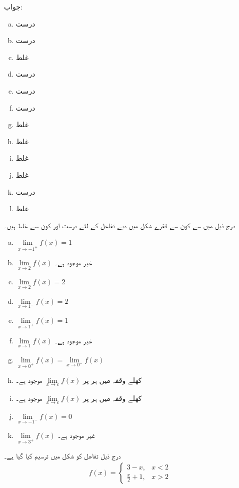 جواب:\quad
\begin{multicols}{6}
\begin{enumerate}[a.]
\item
درست
\item
درست
\item
غلط
\item
درست
\item
درست
\item
درست
\item
غلط
\item
غلط
\item
غلط
\item
غلط
\item
درست
\item
غلط
\end{enumerate}
\end{multicols}
درج ذیل میں سے کون سے فقرے شکل  میں دیے تفاعل کے لئے درست اور کون سے غلط ہیں۔
\begin{multicols}{2}
\begin{enumerate}[a.]
\item
$\lim\limits_{x\to -1^+}f(x)=1$
\item
$\lim\limits_{x\to 2}f(x)$
غیر موجود ہے۔
\item
$\lim\limits_{x\to 2}f(x)=2$
\item
$\lim\limits_{x\to 1^-}f(x)=2$
\item
$\lim\limits_{x\to 1^+}f(x)=1$
\item
$\lim\limits_{x\to 1}f(x)$
غیر موجود ہے۔
\item
$\lim\limits_{x\to 0^+}f(x)=\lim\limits_{x\to 0^-}f(x)$
\item
کھلے وقفہ  میں ہر  پر 
$\lim\limits_{x\to c}f(x)$
موجود ہے۔
\item
کھلے وقفہ  میں ہر  پر 
$\lim\limits_{x\to c}f(x)$
موجود ہے۔
\item
$\lim\limits_{x\to -1^-}f(x)=0$
\item
$\lim\limits_{x\to 3^+}f(x)$
غیر موجود ہے۔
\end{enumerate}
\end{multicols}
درج ذیل تفاعل کو شکل  میں ترسیم کیا گیا ہے۔
\begin{align*}
f(x)=\begin{cases} 3-x,&x<2\\ \tfrac{x}{2}+1,&x>2 \end{cases}
\end{align*}
